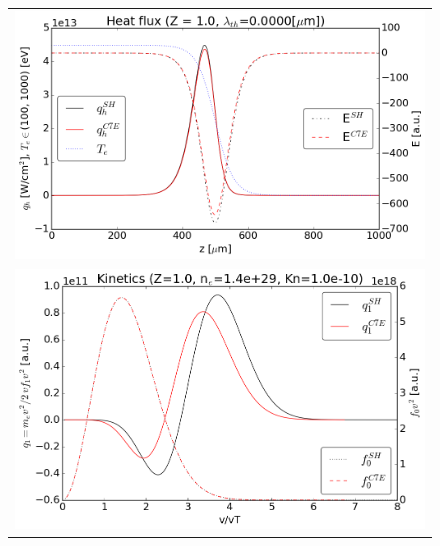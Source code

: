 \documentclass[preprint,12pt]{elsarticle}
\begin{document}
\begin{figure}[tbh]
  \begin{center}
    \begin{tabular}{c}
      \includegraphics[width=1.0\textwidth]{../results/fe_analysis/C7E/P5_heatflux_Z1_fullF.png} \\ 
      \includegraphics[width=1.0\textwidth]{../results/fe_analysis/C7E/P5_kinetics_Z1_fullF.png}
    \end{tabular}
  \caption{
  }
  \end{center}
  \label{fig:AWBScorrection_f1}
\end{figure}
\end{document}
